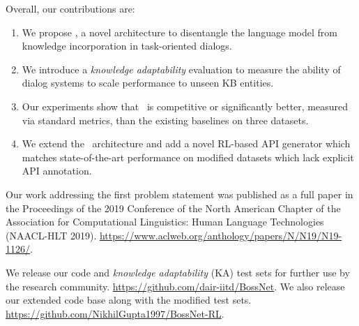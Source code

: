 Overall, our contributions are:

\begin{enumerate}
 \item We propose \sys, a novel architecture to disentangle the language model from knowledge incorporation in task-oriented dialogs.
 \item We introduce a {\em knowledge adaptability} evaluation to measure the ability of dialog systems to scale performance to unseen KB entities.
 \item Our experiments show that \sys\ is competitive or significantly better, measured via standard metrics, than the existing baselines on three datasets.
 \item We extend the \sys\ architecture and add a novel RL-based API generator which matches state-of-the-art performance on modified datasets which lack explicit API annotation.
\end{enumerate}

Our work addressing the first problem statement was published as a full paper in the Proceedings of the 2019 Conference of the North American Chapter of the Association for Computational Linguistics: Human Language Technologies (NAACL-HLT 2019). \url{https://www.aclweb.org/anthology/papers/N/N19/N19-1126/}.

We release our code and {\em knowledge adaptability} (KA) test sets for further use by the research community. \url{ https://github.com/dair-iitd/BossNet}. We also release our extended code base along with the modified test sets. \url{ https://github.com/NikhilGupta1997/BossNet-RL}.

